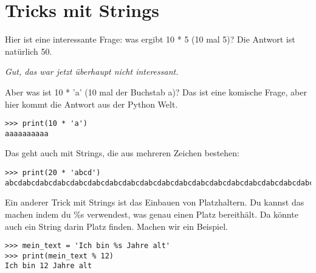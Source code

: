 \section{Tricks mit Strings}\label{trickswithstrings}

Hier ist eine interessante Frage: was ergibt 10 * 5 (10 mal 5)? Die Antwort ist natürlich 50.

\noindent
\emph{Gut, das war jetzt überhaupt nicht interessant.}

Aber was ist 10 * 'a' (10 mal der Buchstab a)? Das ist eine komische Frage, aber hier kommt die Antwort aus der Python Welt.

\begin{Verbatim}[frame=single]
>>> print(10 * 'a')
aaaaaaaaaa
\end{Verbatim}

Das geht auch mit Strings, die aus mehreren Zeichen bestehen:

\begin{Verbatim}[frame=single]
>>> print(20 * 'abcd')
abcdabcdabcdabcdabcdabcdabcdabcdabcdabcdabcdabcdabcdabcdabcdabcdabcdabcdabcdabcd
\end{Verbatim}

Ein anderer Trick mit Strings ist das Einbauen von Platzhaltern. Du kannst das machen indem du \%s verwendest, was genau einen Platz bereithält. Da könnte auch ein String darin Platz finden. Machen wir ein Beispiel.

\begin{Verbatim}[frame=single]
>>> mein_text = 'Ich bin %s Jahre alt'
>>> print(mein_text % 12)
Ich bin 12 Jahre alt
\end{Verbatim}

